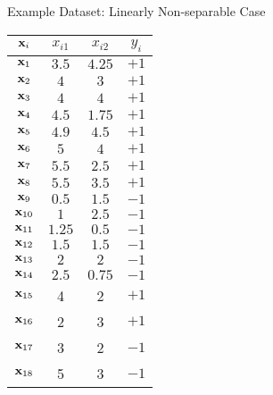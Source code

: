 \begin{frame}{Example Dataset: Linearly Non-separable Case}
  \scriptsize
\renewcommand{\arraystretch}{1.1}
\begin{center}
\begin{tabular}{|c|c|c|c|}
        \hline
        $\mathbf{x}_i$ & $x_{i1}$ & $x_{i2}$ & $y_i$\\
        \hline
        $\mathbf{x}_1$ & $3.5$ & $4.25$ & $+1$\\
        $\mathbf{x}_2$ & $4$ & $3$ & $+1$\\
        $\mathbf{x}_3$ & $4$ & $4$ & $+1$\\
        $\mathbf{x}_4$ & $4.5$ & $1.75$ & $+1$\\
        $\mathbf{x}_5$ & $4.9$ & $4.5$ & $+1$\\
        $\mathbf{x}_6$ & $5$ & $4$ & $+1$\\
        $\mathbf{x}_7$ & $5.5$ & $2.5$ & $+1$\\
        $\mathbf{x}_8$ & $5.5$ & $3.5$ & $+1$\\
        $\mathbf{x}_9$ & $0.5$ & $1.5$ & $-1$\\
        $\mathbf{x}_{10}$ & $1$ & $2.5$ & $-1$\\
        $\mathbf{x}_{11}$ & $1.25$ & $0.5$ & $-1$\\
        $\mathbf{x}_{12}$ & $1.5$ & $1.5$ & $-1$\\
        $\mathbf{x}_{13}$ & $2$ & $2$ & $-1$\\
        $\mathbf{x}_{14}$ & $2.5$ & $0.75$ & $-1$\\
        \hline
        $\mathbf{x}_{15}$ & 4 & 2 & $+1$\\
        $\mathbf{x}_{16}$ & 2 & 3 & $+1$\\
        $\mathbf{x}_{17}$ & 3 & 2 & $-1$\\
        $\mathbf{x}_{18}$ & 5 & 3 & $-1$\\
		\hline
    \end{tabular}%
\end{center}
\end{frame}


